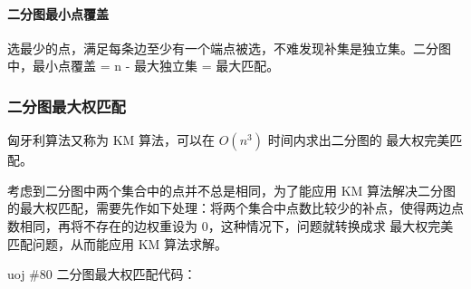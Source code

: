 \documentclass[UTF8]{ctexart}
\begin{document}
\paragraph{二分图最小点覆盖}
选最少的点，满足每条边至少有一个端点被选，不难发现补集是独立集。二分图中，最小点覆盖 = n - 最大独立集 = 最大匹配。


\subsubsection{二分图最大权匹配}
匈牙利算法又称为 KM 算法，可以在 $O(n^3)$ 时间内求出二分图的 最大权完美匹配。

考虑到二分图中两个集合中的点并不总是相同，为了能应用 KM 算法解决二分图的最大权匹配，需要先作如下处理：将两个集合中点数比较少的补点，使得两边点数相同，再将不存在的边权重设为 $0$，这种情况下，问题就转换成求 最大权完美匹配问题，从而能应用 KM 算法求解。

uoj \#80 二分图最大权匹配代码：
\end{document}
